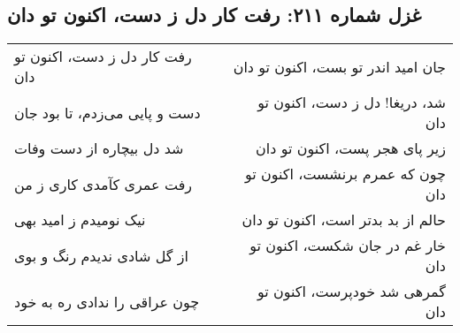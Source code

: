 \begin{center}
\section*{غزل شماره ۲۱۱: رفت کار دل ز دست، اکنون تو دان}
\label{sec:211}
\begin{longtable}{l p{0.5cm} r}
رفت کار دل ز دست، اکنون تو دان
&&
جان امید اندر تو بست، اکنون تو دان
\\
دست و پایی می‌زدم، تا بود جان
&&
شد، دریغا! دل ز دست، اکنون تو دان
\\
شد دل بیچاره از دست وفات
&&
زیر پای هجر پست، اکنون تو دان
\\
رفت عمری کآمدی کاری ز من
&&
چون که عمرم برنشست، اکنون تو دان
\\
نیک نومیدم ز امید بهی
&&
حالم از بد بدتر است، اکنون تو دان
\\
از گل شادی ندیدم رنگ و بوی
&&
خار غم در جان شکست، اکنون تو دان
\\
چون عراقی را ندادی ره به خود
&&
گمرهی شد خودپرست، اکنون تو دان
\\
\end{longtable}
\end{center}

